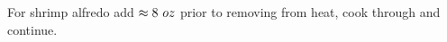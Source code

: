 \begin{variation}

\item For shrimp alfredo add $\approx8~oz$ prior to removing from heat, cook through and continue.
\end{variation}


\recipeend%
